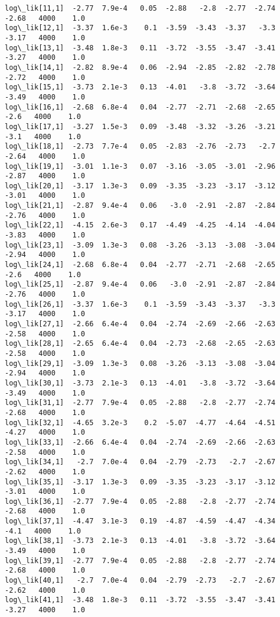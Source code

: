 \documentclass[11pt]{article}
\begin{document}
\begin{Verbatim}[commandchars=\\\{\}]
log\_lik[11,1]  -2.77  7.9e-4   0.05  -2.88   -2.8  -2.77  -2.74  -2.68   4000    1.0
log\_lik[12,1]  -3.37  1.6e-3    0.1  -3.59  -3.43  -3.37   -3.3  -3.17   4000    1.0
log\_lik[13,1]  -3.48  1.8e-3   0.11  -3.72  -3.55  -3.47  -3.41  -3.27   4000    1.0
log\_lik[14,1]  -2.82  8.9e-4   0.06  -2.94  -2.85  -2.82  -2.78  -2.72   4000    1.0
log\_lik[15,1]  -3.73  2.1e-3   0.13  -4.01   -3.8  -3.72  -3.64  -3.49   4000    1.0
log\_lik[16,1]  -2.68  6.8e-4   0.04  -2.77  -2.71  -2.68  -2.65   -2.6   4000    1.0
log\_lik[17,1]  -3.27  1.5e-3   0.09  -3.48  -3.32  -3.26  -3.21   -3.1   4000    1.0
log\_lik[18,1]  -2.73  7.7e-4   0.05  -2.83  -2.76  -2.73   -2.7  -2.64   4000    1.0
log\_lik[19,1]  -3.01  1.1e-3   0.07  -3.16  -3.05  -3.01  -2.96  -2.87   4000    1.0
log\_lik[20,1]  -3.17  1.3e-3   0.09  -3.35  -3.23  -3.17  -3.12  -3.01   4000    1.0
log\_lik[21,1]  -2.87  9.4e-4   0.06   -3.0  -2.91  -2.87  -2.84  -2.76   4000    1.0
log\_lik[22,1]  -4.15  2.6e-3   0.17  -4.49  -4.25  -4.14  -4.04  -3.83   4000    1.0
log\_lik[23,1]  -3.09  1.3e-3   0.08  -3.26  -3.13  -3.08  -3.04  -2.94   4000    1.0
log\_lik[24,1]  -2.68  6.8e-4   0.04  -2.77  -2.71  -2.68  -2.65   -2.6   4000    1.0
log\_lik[25,1]  -2.87  9.4e-4   0.06   -3.0  -2.91  -2.87  -2.84  -2.76   4000    1.0
log\_lik[26,1]  -3.37  1.6e-3    0.1  -3.59  -3.43  -3.37   -3.3  -3.17   4000    1.0
log\_lik[27,1]  -2.66  6.4e-4   0.04  -2.74  -2.69  -2.66  -2.63  -2.58   4000    1.0
log\_lik[28,1]  -2.65  6.4e-4   0.04  -2.73  -2.68  -2.65  -2.63  -2.58   4000    1.0
log\_lik[29,1]  -3.09  1.3e-3   0.08  -3.26  -3.13  -3.08  -3.04  -2.94   4000    1.0
log\_lik[30,1]  -3.73  2.1e-3   0.13  -4.01   -3.8  -3.72  -3.64  -3.49   4000    1.0
log\_lik[31,1]  -2.77  7.9e-4   0.05  -2.88   -2.8  -2.77  -2.74  -2.68   4000    1.0
log\_lik[32,1]  -4.65  3.2e-3    0.2  -5.07  -4.77  -4.64  -4.51  -4.27   4000    1.0
log\_lik[33,1]  -2.66  6.4e-4   0.04  -2.74  -2.69  -2.66  -2.63  -2.58   4000    1.0
log\_lik[34,1]   -2.7  7.0e-4   0.04  -2.79  -2.73   -2.7  -2.67  -2.62   4000    1.0
log\_lik[35,1]  -3.17  1.3e-3   0.09  -3.35  -3.23  -3.17  -3.12  -3.01   4000    1.0
log\_lik[36,1]  -2.77  7.9e-4   0.05  -2.88   -2.8  -2.77  -2.74  -2.68   4000    1.0
log\_lik[37,1]  -4.47  3.1e-3   0.19  -4.87  -4.59  -4.47  -4.34   -4.1   4000    1.0
log\_lik[38,1]  -3.73  2.1e-3   0.13  -4.01   -3.8  -3.72  -3.64  -3.49   4000    1.0
log\_lik[39,1]  -2.77  7.9e-4   0.05  -2.88   -2.8  -2.77  -2.74  -2.68   4000    1.0
log\_lik[40,1]   -2.7  7.0e-4   0.04  -2.79  -2.73   -2.7  -2.67  -2.62   4000    1.0
log\_lik[41,1]  -3.48  1.8e-3   0.11  -3.72  -3.55  -3.47  -3.41  -3.27   4000    1.0

\end{Verbatim}
\end{document}
